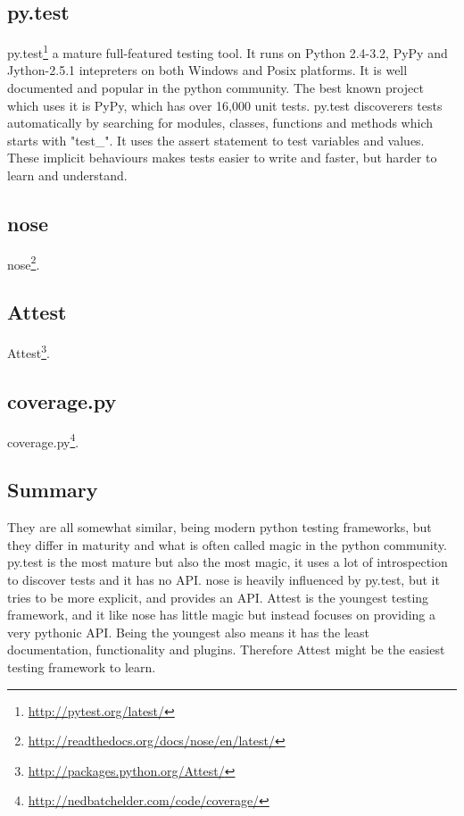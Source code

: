 \subsection{py.test}
py.test\footnote{\url{http://pytest.org/latest/}} a mature full-featured testing
tool. It runs on Python 2.4-3.2, PyPy and Jython-2.5.1 intepreters on both
Windows and Posix platforms. It is well documented and popular in the python
community. The best known project which uses it is PyPy, which has over 16,000
unit tests. py.test discoverers tests automatically by searching for modules,
classes, functions and methods which starts with "test\_". It uses the assert
statement to test variables and values. These implicit behaviours makes tests
easier to write and faster, but harder to learn and understand.

\subsection{nose}
nose\footnote{\url{http://readthedocs.org/docs/nose/en/latest/}}.

\subsection{Attest}
Attest\footnote{\url{http://packages.python.org/Attest/}}.

\subsection{coverage.py}
coverage.py\footnote{\url{http://nedbatchelder.com/code/coverage/}}.

\subsection{Summary}
They are all somewhat similar, being modern python testing frameworks, but they
differ in maturity and what is often called magic in the python community.
py.test is the most mature but also the most magic, it uses a lot of
introspection to discover tests and it has no API. nose is heavily influenced
by py.test, but it tries to be more explicit, and provides an API. Attest is
the youngest testing framework, and it like nose has little magic but instead
focuses on providing a very pythonic API. Being the youngest also means it has
the least documentation, functionality and plugins. Therefore Attest might be
the easiest testing framework to learn.


